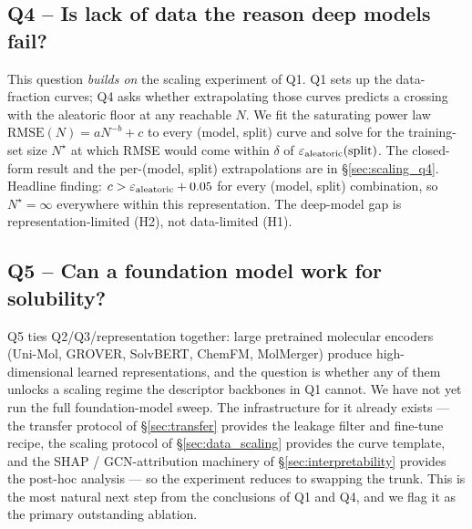 \subsection{Q4 -- Is lack of data the reason deep models fail?}
\label{sec:ablations_q4}

This question \emph{builds on} the scaling experiment of Q1.  Q1 sets
up the data-fraction curves; Q4 asks whether extrapolating those curves
predicts a crossing with the aleatoric floor at any reachable $N$.
We fit the saturating power law
$\mathrm{RMSE}(N) = aN^{-b} + c$ to every (model, split) curve and
solve for the training-set size $N^\star$ at which RMSE would come
within $\delta$ of $\varepsilon_{\text{aleatoric}}(\text{split})$.  The closed-form result and
the per-(model, split) extrapolations are in §\ref{sec:scaling_q4}.
Headline finding: $c > \varepsilon_{\text{aleatoric}} + 0.05$ for every (model, split)
combination, so $N^\star = \infty$ everywhere within this
representation.  The deep-model gap is representation-limited (H2),
not data-limited (H1).

\subsection{Q5 -- Can a foundation model work for solubility?}
\label{sec:ablations_q5}

Q5 ties Q2/Q3/representation together: large pretrained molecular
encoders (Uni-Mol, GROVER, SolvBERT, ChemFM, MolMerger) produce
high-dimensional learned representations, and the question is whether
any of them unlocks a scaling regime the descriptor backbones in Q1
cannot.  We have not yet run the full foundation-model sweep.  The
infrastructure for it already exists --- the transfer protocol of
§\ref{sec:transfer} provides the leakage filter and fine-tune recipe,
the scaling protocol of §\ref{sec:data_scaling} provides the curve
template, and the SHAP / GCN-attribution machinery of
§\ref{sec:interpretability} provides the post-hoc analysis --- so the
experiment reduces to swapping the trunk.  This is the most natural
next step from the conclusions of Q1 and Q4, and we flag it as the
primary outstanding ablation.
